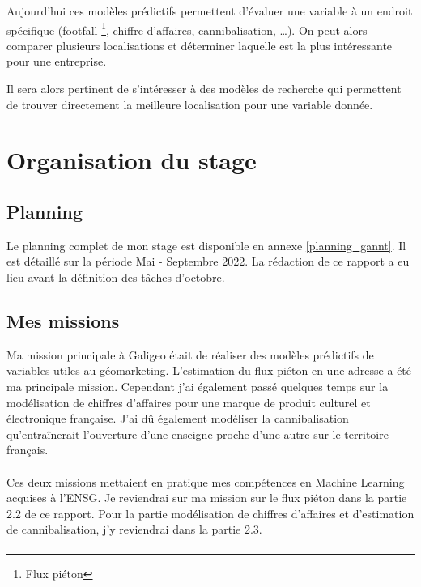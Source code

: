 Aujourd’hui ces modèles prédictifs permettent d’évaluer une variable à un endroit spécifique (footfall \footnote{Flux piéton}, chiffre d’affaires, cannibalisation, …). On peut alors comparer plusieurs localisations et déterminer laquelle est la plus intéressante pour une entreprise.

Il sera alors pertinent de s’intéresser à des modèles de recherche qui permettent de trouver directement la meilleure localisation pour une variable donnée.


\section{Organisation du stage}

\subsection{Planning}

Le planning complet de mon stage est disponible en annexe \ref{planning_gannt}. Il est détaillé sur la période Mai - Septembre 2022. La rédaction de ce rapport a eu lieu avant la définition des tâches d'octobre.

\subsection{Mes missions}

Ma mission principale à Galigeo était de réaliser des modèles prédictifs de variables utiles au géomarketing. L’estimation du flux piéton en une adresse a été ma principale mission. Cependant j’ai également passé quelques temps sur la modélisation de chiffres d’affaires pour une marque de produit culturel et électronique française. J’ai dû également modéliser la cannibalisation qu’entraînerait l’ouverture d’une enseigne proche d’une autre sur le territoire français.

\paragraph*{}

Ces deux missions mettaient en pratique mes compétences en Machine Learning acquises à l’ENSG. Je reviendrai sur ma mission sur le flux piéton dans la partie 2.2 de ce rapport. Pour la partie modélisation de chiffres d’affaires et d’estimation de cannibalisation, j’y reviendrai dans la partie 2.3.

\paragraph*{}

